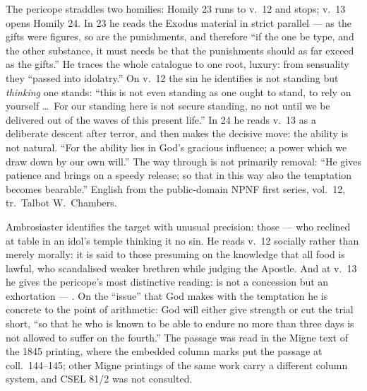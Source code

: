 \begin{witnessnote}
The pericope straddles two homilies: Homily 23 runs to v.~12 and stops;
v.~13 opens Homily 24. In 23 he reads the Exodus material in strict parallel
--- as the gifts were figures, so are the punishments, and therefore ``if the
one be type, and the other substance, it must needs be that the punishments
should as far exceed as the gifts.'' He traces the whole catalogue to one
root, luxury: from sensuality they ``passed into idolatry.'' On v.~12 the sin
he identifies is not standing but \textit{thinking} one stands: ``this is not
even standing as one ought to stand, to rely on yourself \dots\ For our
standing here is not secure standing, no not until we be delivered out of the
waves of this present life.'' In 24 he reads v.~13 as a deliberate descent
after terror, and then makes the decisive move: the ability is not natural.
``For the ability lies in God's gracious influence; a power which we draw down
by our own will.'' The way through is not primarily removal: ``He gives
patience and brings on a speedy release; so that in this way also the
temptation becomes bearable.'' English from the public-domain NPNF first
series, vol.~12, tr.\ Talbot W.~Chambers.
\end{witnessnote}

\begin{witnessnote}
Ambrosiaster identifies the target with unusual precision: those  --- who reclined at table in an
idol's temple thinking it no sin. He reads v.~12 socially rather than merely
morally: it is said to those presuming on the knowledge that all food is
lawful, who scandalised weaker brethren while judging the Apostle. And at
v.~13 he gives the pericope's most distinctive reading:  is not a concession but an exhortation --- . On the
``issue'' that God makes with the temptation he is concrete to the point of
arithmetic: God will either give strength or cut the trial short, ``so that he
who is known to be able to endure no more than three days is not allowed to
suffer on the fourth.'' The passage was read in the Migne text of the 1845
printing, where the embedded column marks put the passage at
coll.~144--145; other Migne printings of the same work carry a different
column system, and CSEL 81/2 was not consulted.
\end{witnessnote}

